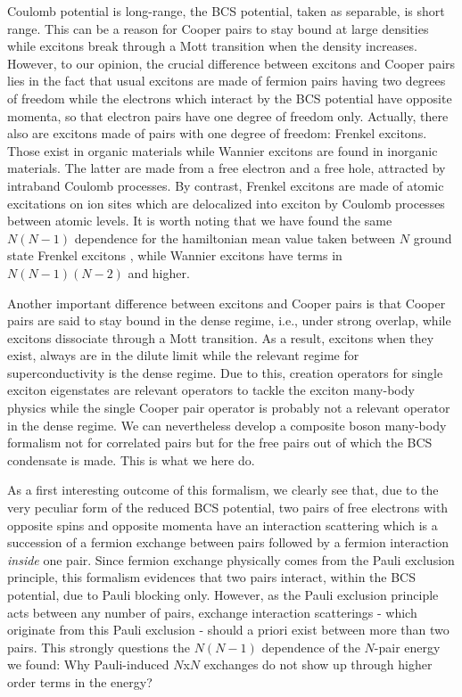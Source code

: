 \documentclass[aps,prb,superscriptaddress,showpacs,reprint,lengthcheck]{revtex4}
\begin{document}
  Coulomb potential is long-range, the BCS potential, taken as separable, is short range. This can be a reason for Cooper pairs to stay bound at large densities while excitons break through a Mott transition when the density increases. However, to our opinion, the crucial difference between excitons and Cooper pairs lies in the fact that usual excitons  are made of fermion pairs having two degrees of freedom while the electrons which interact by the BCS potential have opposite momenta, so that electron pairs have one degree of freedom only.  Actually, there also are excitons made of pairs with one degree of freedom: Frenkel excitons. Those exist in organic materials while Wannier excitons are found in inorganic materials. The latter are made from a free electron and a free hole, attracted by intraband Coulomb processes. By contrast, Frenkel excitons are made of atomic excitations on ion sites which are delocalized into exciton by Coulomb processes between atomic levels.  It is worth noting that we have found the same  $N(N-1)$ dependence for the hamiltonian mean value taken between $N$ ground state Frenkel excitons \cite{frenkel}, while Wannier excitons have terms in $N(N-1)(N-2)$ and higher\cite{monicOdil}.




 Another important difference between excitons and Cooper pairs is that Cooper pairs are said to stay bound in the dense regime, i.e., under strong overlap, while excitons dissociate through a Mott transition. As a result, excitons when they exist, always are in the dilute limit while the relevant regime for superconductivity is the dense regime. Due to this, creation operators for single exciton eigenstates are relevant operators to tackle the exciton many-body physics while the single Cooper pair operator is probably not a relevant operator in the dense regime. We can nevertheless develop a composite boson many-body formalism not for correlated pairs but for the free pairs out of which the BCS condensate is made. This is what we here do.

As a first interesting outcome of this formalism, we clearly see that, due to the very peculiar form of the reduced BCS potential, two pairs of free electrons with opposite spins and opposite momenta have an interaction scattering which is a succession of a fermion exchange between pairs followed by a fermion interaction \textit{inside} one pair. Since fermion exchange physically comes from the Pauli exclusion principle, this formalism evidences that two pairs interact, within the BCS potential, due to Pauli blocking only. However, as the Pauli exclusion principle acts between any number of pairs, exchange interaction scatterings - which originate from this Pauli exclusion - should a priori exist between more than two pairs. This strongly questions the $N(N-1)$ dependence of the $N$-pair energy we found: Why Pauli-induced $N$x$N$ exchanges do not show up through higher order terms in the energy?
\end{document}
